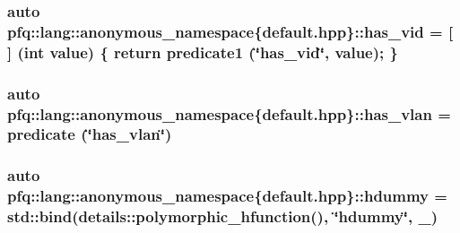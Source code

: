 \hypertarget{namespacepfq_1_1lang_1_1anonymous__namespace_02default_8hpp_03_a99c204d8095fdccd50d4cb24d32e5b5b}{
\subsubsection[{has\+\_\+vid}]{\setlength{\rightskip}{0pt plus 5cm}auto pfq\+::lang\+::anonymous\+\_\+namespace\{default.\+hpp\}\+::has\+\_\+vid = \mbox{[}$\,$\mbox{]} (int value) \{ return {\bf predicate1} (\char`\"{}has\+\_\+vid\char`\"{}, value); \}}}\label{namespacepfq_1_1lang_1_1anonymous__namespace_02default_8hpp_03_a99c204d8095fdccd50d4cb24d32e5b5b}
\hypertarget{namespacepfq_1_1lang_1_1anonymous__namespace_02default_8hpp_03_a1f0378ddfa90777d11ffae5fbb57b4e0}{
\subsubsection[{has\+\_\+vlan}]{\setlength{\rightskip}{0pt plus 5cm}auto pfq\+::lang\+::anonymous\+\_\+namespace\{default.\+hpp\}\+::has\+\_\+vlan = {\bf predicate} (\char`\"{}has\+\_\+vlan\char`\"{})}}\label{namespacepfq_1_1lang_1_1anonymous__namespace_02default_8hpp_03_a1f0378ddfa90777d11ffae5fbb57b4e0}
\hypertarget{namespacepfq_1_1lang_1_1anonymous__namespace_02default_8hpp_03_a5ce9765c320b01cb2c6d9b9cba0f13ff}{
\subsubsection[{hdummy}]{\setlength{\rightskip}{0pt plus 5cm}auto pfq\+::lang\+::anonymous\+\_\+namespace\{default.\+hpp\}\+::hdummy = std\+::bind(details\+::polymorphic\+\_\+hfunction(), \char`\"{}hdummy\char`\"{}, \+\_)}}\label{namespacepfq_1_1lang_1_1anonymous__namespace_02default_8hpp_03_a5ce9765c320b01cb2c6d9b9cba0f13ff}
